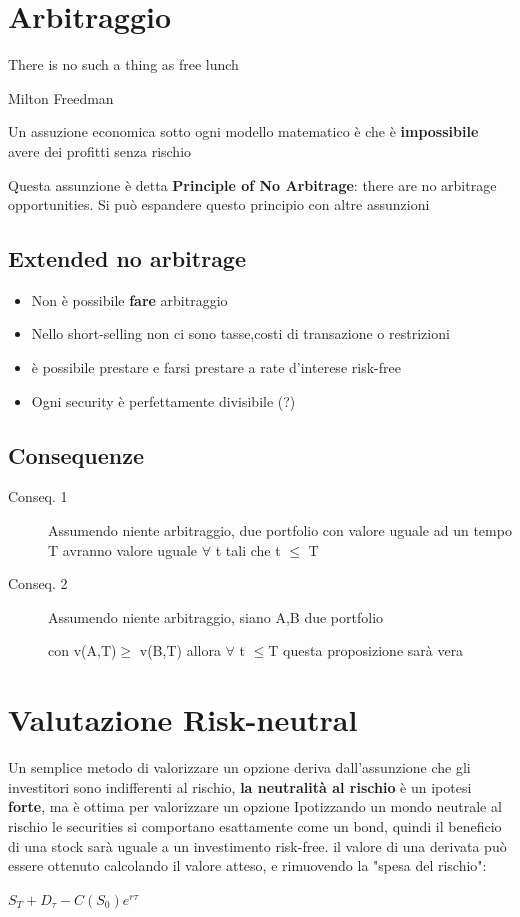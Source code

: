 \documentclass[a4paper,11pt]{report}
\begin{document}
{%
\section{Arbitraggio}
\epigraph{There is no such a thing as free lunch}{Milton Freedman } 
	Un assuzione economica sotto ogni modello matematico è che è \textbf{impossibile} avere dei profitti senza rischio \newline
	
	Questa assunzione è detta \textbf{Principle of No Arbitrage}: there are no arbitrage opportunities. \newline
	Si può espandere questo principio con altre assunzioni \newline
\subsection{Extended no arbitrage}
\begin{itemize}
	\item Non è possibile \textbf{fare} arbitraggio
	\item Nello short-selling non ci sono tasse,costi di transazione o restrizioni
	\item è possibile prestare e farsi prestare a rate d'interese risk-free
	\item Ogni security è perfettamente divisibile (?)
\end{itemize}
\subsection{Consequenze}
\begin{description}
	\item[Conseq. 1] Assumendo niente arbitraggio, due portfolio con valore uguale ad un tempo T avranno valore uguale 		$\forall$ t tali che t $\leq$ T
	\item[Conseq. 2] Assumendo niente arbitraggio, siano A,B due portfolio

	 con v(A,T)$\geq$ v(B,T) allora $\forall$ t $\leq$T questa proposizione sarà vera
\end{description}

\section{Valutazione Risk-neutral}
	Un semplice metodo di valorizzare un opzione deriva dall'assunzione che gli investitori sono indifferenti al rischio, \newline
	\textbf{la neutralità al rischio} è un ipotesi \textbf{forte}, ma è ottima per valorizzare un opzione \newline
	Ipotizzando un mondo neutrale al rischio le securities si comportano esattamente come un bond, quindi il beneficio di una stock sarà uguale a un investimento risk-free.
	il valore di una derivata può essere ottenuto calcolando il valore atteso, e rimuovendo la "spesa del rischio":
\begin{center}
	$S_T + D_\tau - C(S_0)e^{r\tau}$
\end{center}
}
\end{document}
